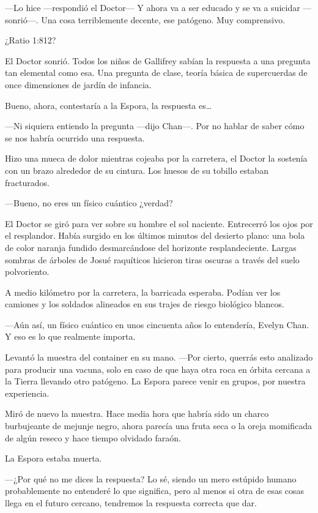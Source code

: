 ---Lo hice ---respondió el Doctor--- Y ahora va a ser educado y se va a
suicidar ---sonrió---. Una cosa terriblemente decente, ese patógeno. Muy
comprensivo.

¿Ratio 1:812?

El Doctor sonrió. Todos los niños de Gallifrey sabían la respuesta a una
pregunta tan elemental como esa. Una pregunta de clase, teoría básica de
supercuerdas de once dimensiones de jardín de infancia.

Bueno, ahora, contestaría a la Espora, la respuesta es\ldots{}

---Ni siquiera entiendo la pregunta ---dijo Chan---. Por no hablar de
saber cómo se nos habría ocurrido una respuesta.

Hizo una mueca de dolor mientras cojeaba por la carretera, el Doctor la
sostenía con un brazo alrededor de su cintura. Los huesos de su tobillo
estaban fracturados.

---Bueno, no eres un físico cuántico ¿verdad?

El Doctor se giró para ver sobre su hombre el sol naciente. Entrecerró
los ojos por el resplandor. Había surgido en los últimos minutos del
desierto plano: una bola de color naranja fundido desmarcándose del
horizonte resplandeciente. Largas sombras de árboles de Josué raquíticos
hicieron tiras oscuras a través del suelo polvoriento.

A medio kilómetro por la carretera, la barricada esperaba. Podían ver
los camiones y los soldados alineados en sus trajes de riesgo biológico
blancos.

---Aún así, un físico cuántico en unos cincuenta años lo entendería,
Evelyn Chan. Y eso es lo que realmente importa.

Levantó la muestra del container en su mano. ---Por cierto, querrás esto
analizado para producir una vacuna, solo en caso de que haya otra roca
en órbita cercana a la Tierra llevando otro patógeno. La Espora parece
venir en grupos, por nuestra experiencia.

Miró de nuevo la muestra. Hace media hora que habría sido un charco
burbujeante de mejunje negro, ahora parecía una fruta seca o la oreja
momificada de algún reseco y hace tiempo olvidado faraón.

La Espora estaba muerta.

---¿Por qué no me dices la respuesta? Lo sé, siendo un mero estúpido
humano probablemente no entenderé lo que significa, pero al menos si
otra de esas cosas llega en el futuro cercano, tendremos la respuesta
correcta que dar.

